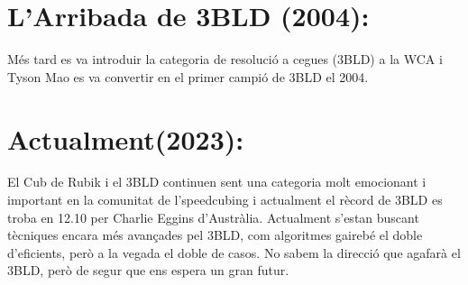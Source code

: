 \section{L'Arribada de 3BLD (2004):}

Més tard es va introduir la categoria de resolució a cegues (3BLD) a la WCA i Tyson Mao es va convertir en el primer campió de 3BLD el 2004.

\section{Actualment(2023):}

El Cub de Rubik i el 3BLD continuen sent una categoria molt emocionant i important en
la comunitat de l'speedcubing i actualment el rècord de 3BLD es troba en 12.10 per Charlie
Eggins d'Austràlia. Actualment s'estan buscant tècniques encara més avançades pel 3BLD,
com algoritmes gairebé el doble d'eficients, però a la vegada el doble de casos. No sabem la
direcció que agafarà el 3BLD, però de segur que ens espera un gran futur.\cite{worldcubeassociation}




